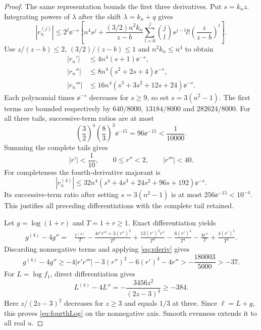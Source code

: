 \begin{proof}
The same representation bounds the first three derivatives. Put $s=k_nz$. Integrating powers of $\lambda$ after the shift $\lambda=k_n+q$ gives
\[
|r_n^{(j)}|\le2^j\ee^{-s}\left[n^4s^j+
\frac{(3/2)n^2k_n}{z-b}
\sum_{l=0}^j\binom jl s^{j-l}l!\left(\frac z{z-b}\right)^l\right].
\]
Use $z/(z-b)\le2$, $(3/2)/(z-b)\le1$ and $n^2k_n\le n^4$ to obtain
\begin{align}
|r_n'|&\le4n^4(s+1)\ee^{-s},\\
|r_n''|&\le8n^4(s^2+2s+4)\ee^{-s},\\
|r_n'''|&\le16n^4(s^3+3s^2+12s+24)\ee^{-s}.
\end{align}
Each polynomial times $\ee^{-s}$ decreases for $s\ge9$, so set $s=3(n^2-1)$. The first terms are bounded respectively by
$640/8000$, $13184/8000$ and $282624/8000$. For all three tails, successive-term ratios are at most
\[
\left(\frac32\right)^4\left(\frac83\right)^3\ee^{-15}
=96\ee^{-15}<\frac1{10000}.
\]
Summing the complete tails gives
\begin{equation}\label{eq:rderiv}
|r'|<\frac1{10},\qquad 0\le r''<2,\qquad |r'''|<40.
\end{equation}
For completeness the fourth-derivative majorant is
\[
|r_n^{(4)}|\le32n^4(s^4+4s^3+24s^2+96s+192)\ee^{-s}.
\]
Its successive-term ratio after setting $s=3(n^2-1)$ is at most $256\ee^{-15}<10^{-4}$. This justifies all preceding differentiations with the complete tail retained.

Let $g=\log(1+r)$ and $T=1+r\ge1$. Exact differentiation yields
\begin{align*}
g^{(4)}-4g''={}&\frac{r^{(4)}}T
-\frac{4r'r'''+3(r'')^2}{T^2}
+\frac{12(r')^2r''}{T^3}
-\frac{6(r')^4}{T^4}
-\frac{4r''}T+\frac{4(r')^2}{T^2}.
\end{align*}
Discarding nonnegative terms and applying \eqref{eq:rderiv} gives
\[
g^{(4)}-4g''
\ge-4|r'r'''|-3(r'')^2-6(r')^4-4r''
>-\frac{180003}{5000}>-37.
\]
For $L=\log f_1$, direct differentiation gives
\[
L^{(4)}-4L''=-\frac{3456z^2}{(2z-3)^4}\ge-384.
\]
Here $z/(2z-3)^2$ decreases for $z\ge3$ and equals $1/3$ at three. Since $\ell=L+g$, this proves \eqref{eq:fourthLog} on the nonnegative axis. Smooth evenness extends it to all real $u$.
\end{proof}

